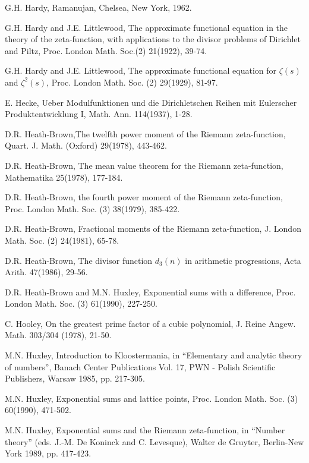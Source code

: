 \begin{thebibliography}{99}
 G.H. Hardy, Ramanujan, Chelsea, New York, 1962.

 G.H. Hardy and J.E. Littlewood, The  approximate functional equation in the theory of the zeta-function, with applications to the divisor problems of Dirichlet and Piltz, Proc. London Math. Soc.(2) 21(1922), 39-74.

 G.H. Hardy and J.E. Littlewood, The approximate functional equation for $\zeta(s)$ and $\zeta^2(s)$, Proc. London Math. Soc. (2) 29(1929), 81-97.

 E. Hecke, Ueber Modulfunktionen und die Dirichletschen Reihen mit Eulerscher Produktentwicklung I, Math. Ann. 114(1937), 1-28.

 D.R. Heath-Brown,\pageoriginale The twelfth power moment of the Riemann zeta-function, Quart. J. Math. (Oxford) 29(1978), 443-462.

 D.R. Heath-Brown, The mean value theorem for the Riemann zeta-function, Mathematika 25(1978), 177-184.

 D.R. Heath-Brown, the fourth power moment of the Riemann zeta-function, Proc. London Math. Soc. (3) 38(1979), 385-422.

 D.R. Heath-Brown, Fractional moments of the Riemann zeta-function, J. London Math. Soc. (2) 24(1981), 65-78.

 D.R. Heath-Brown, The divisor function $d_3(n)$ in arithmetic progressions, Acta Arith. 47(1986), 29-56.

 D.R. Heath-Brown and M.N. Huxley, Exponential sums with a difference, Proc. London Math. Soc. (3) 61(1990), 227-250.

 C. Hooley, On the greatest prime factor of a cubic polynomial, J. Reine Angew. Math. 303/304 (1978), 21-50.

 M.N. Huxley, Introduction to Kloostermania, in ``Elementary and analytic theory of numbers'', Banach Center Publications Vol. 17, PWN - Polish Scientific Publishers, Warsaw 1985, pp. 217-305.

 M.N. Huxley, Exponential sums and lattice points, Proc. London Math. Soc. (3) 60(1990), 471-502.

 M.N. Huxley, Exponential sums and the Riemann zeta-function, in ``Number theory'' (eds. J.-M. De Koninck and C. Levesque), Walter de Gruyter, Berlin-New York 1989, pp. 417-423.


\end{thebibliography}
